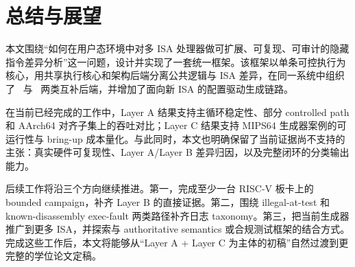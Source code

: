 \chapter{总结与展望}

本文围绕“如何在用户态环境中对多 ISA 处理器做可扩展、可复现、可审计的隐藏指令差异分析”这一问题，设计并实现了一套统一框架。该框架以单条可控执行为核心，用共享执行核心和架构后端分离公共逻辑与 ISA 差异，在同一系统中组织了 \memcage\ 与 \ptracebackend\ 两类互补后端，并增加了面向新 ISA 的配置驱动生成链路。

在当前已经完成的工作中，Layer A 结果支持主循环稳定性、部分 controlled path 和 AArch64 对齐子集上的吞吐对比；Layer C 结果支持 MIPS64 生成器案例的可运行性与 bring-up 成本量化。与此同时，本文也明确保留了当前证据尚不支持的主张：真实硬件可复现性、Layer A/Layer B 差异归因，以及完整闭环的分类输出能力。

后续工作将沿三个方向继续推进。第一，完成至少一台 RISC-V 板卡上的 bounded campaign，补齐 Layer B 的直接证据。第二，围绕 illegal-at-test 和 known-disassembly exec-fault 两类路径补齐日志 taxonomy。第三，把当前生成器推广到更多 ISA，并探索与 authoritative semantics 或合规测试框架的结合方式。完成这些工作后，本文将能够从“Layer A + Layer C 为主体的初稿”自然过渡到更完整的学位论文定稿。
